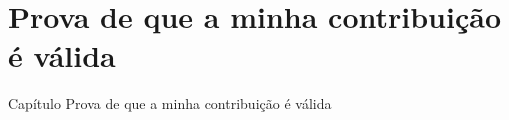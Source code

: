\chapter{Prova de que a minha contribuição é válida}
Capítulo Prova de que a minha contribuição é válida

